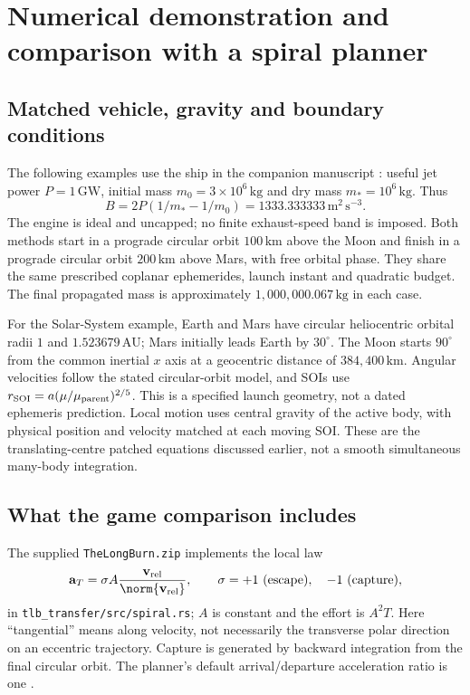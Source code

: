 \section{Numerical demonstration and comparison with a spiral planner}
\label{sec:demonstration}
\subsection{Matched vehicle, gravity and boundary conditions}
The following examples use the ship in the companion manuscript \cite{companion}: useful jet power $P=1\,\mathrm{GW}$, initial mass $m_0=3\times10^6\,\mathrm{kg}$ and dry mass $m_*=10^6\,\mathrm{kg}$. Thus
\begin{equation}
 B=2P(1/m_*-1/m_0)=1333.333333\,\mathrm{m^2\,s^{-3}}.
\end{equation}
The engine is ideal and uncapped; no finite exhaust-speed band is imposed. Both methods start in a prograde circular orbit $100\,\mathrm{km}$ above the Moon and finish in a prograde circular orbit $200\,\mathrm{km}$ above Mars, with free orbital phase. They share the same prescribed coplanar ephemerides, launch instant and quadratic budget. The final propagated mass is approximately $1{,}000{,}000.067\,\mathrm{kg}$ in each case.

For the Solar-System example, Earth and Mars have circular heliocentric orbital radii $1$ and $1.523679\,\mathrm{AU}$; Mars initially leads Earth by $30^\circ$. The Moon starts $90^\circ$ from the common inertial $x$ axis at a geocentric distance of $384{,}400\,\mathrm{km}$. Angular velocities follow the stated circular-orbit model, and SOIs use $r_{\rm SOI}=a(\mu/\mu_{\rm parent})^{2/5}$. This is a specified launch geometry, not a dated ephemeris prediction. Local motion uses central gravity of the active body, with physical position and velocity matched at each moving SOI. These are the translating-centre patched equations discussed earlier, not a smooth simultaneous many-body integration.

\subsection{What the game comparison includes}
The supplied \texttt{TheLongBurn.zip} implements the local law
\begin{equation}
 \mathbf a_T=\sigma A\frac{\mathbf v_{\rm rel}}{\norm{\mathbf v_{\rm rel}}},
 \qquad \sigma=+1\ \hbox{(escape)},\quad -1\ \hbox{(capture)},
 \label{eq:game-law}
\end{equation}
in \texttt{tlb\_transfer/src/spiral.rs}; $A$ is constant and the effort is $A^2T$. Here ``tangential'' means along velocity, not necessarily the transverse polar direction on an eccentric trajectory. Capture is generated by backward integration from the final circular orbit. The planner's default arrival/departure acceleration ratio is one \cite{longburn}.

